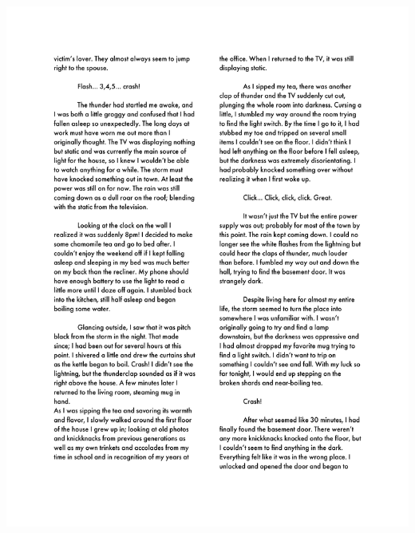 \begin{center}
     \includegraphics[scale=0.75]{Scores/Raindrops Text_Part2.pdf}
\end{center}
\newpage
